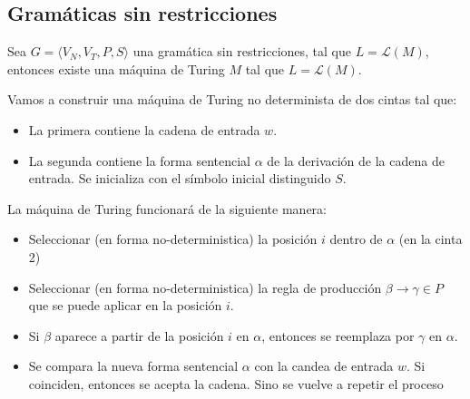 \subsection{Gramáticas sin restricciones}
\begin{teorema}
  Sea \(G=\langle V_N, V_T, P, S \rangle\) una gramática sin restricciones, tal que \(L = \mathcal{L}(M)\), entonces existe una máquina de Turing \(M\) tal que \(L = \mathcal{L}(M)\).
\end{teorema}
\begin{demo}[0.8\textwidth]
  Vamos a construir una máquina de Turing no determinista de dos cintas tal que:
  \begin{itemize}
    \item La primera contiene la cadena de entrada \(w\).
    \item La segunda contiene la forma sentencial \(\alpha\) de la derivación de la cadena de entrada. Se inicializa con el símbolo inicial distinguido \(S\).
  \end{itemize}
\end{demo}
\begin{demoPart}[0.8\textwidth]
  La máquina de Turing funcionará de la siguiente manera:
  \begin{itemize}
    \item Seleccionar (en forma no-deterministica) la posición \(i\) dentro de \(\alpha\) (en la cinta 2)
    \item Seleccionar (en forma no-deterministica) la regla de producción \(\beta \rightarrow \gamma\in P\) que se puede aplicar en la posición \(i\).
    \item Si \(\beta\) aparece a partir de la posición \(i\) en \(\alpha\), entonces se reemplaza por \(\gamma\) en \(\alpha\).
    \item Se compara la nueva forma sentencial \(\alpha\) con la candea de entrada \(w\). Si coinciden, entonces se acepta la cadena. Sino se vuelve a repetir el proceso
  \end{itemize}
\end{demoPart}


